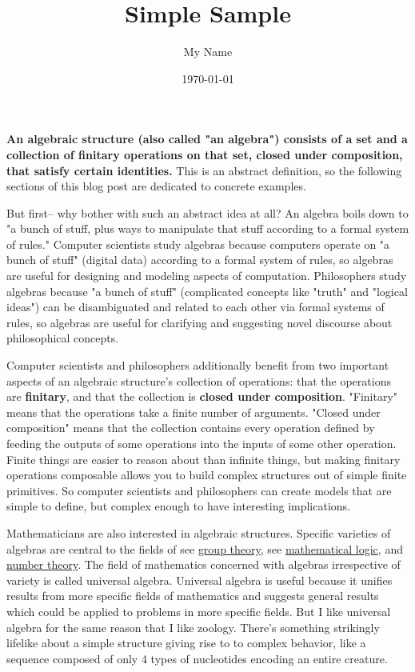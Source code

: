 \documentclass{article} %
\title{Simple Sample} %
\author{My Name} %
\date{\today} %
\begin{document}
\textbf{An algebraic structure (also called "an algebra") consists of a set and a collection of finitary operations on that set, closed under composition, that satisfy certain identities.} This is an abstract definition, so the following sections of this blog post are dedicated to concrete examples.

But first-- why bother with such an abstract idea at all? An algebra boils down to "a bunch of stuff, plus ways to manipulate that stuff according to a formal system of rules." Computer scientists study algebras because computers operate on "a bunch of stuff" (digital data) according to a formal system of rules, so algebras are useful for designing and modeling aspects of computation. Philosophers study algebras because "a bunch of stuff" (complicated concepts like "truth" and "logical ideas") can be disambiguated and related to each other via formal systems of rules, so algebras are useful for clarifying and suggesting novel discourse about philosophical concepts.

Computer scientists and philosophers additionally benefit from two important aspects of an algebraic structure's collection of operations: that the operations are \textbf{finitary}, and that the collection is \textbf{closed under composition}. "Finitary" means that the operations take a finite number of arguments. "Closed under composition" means that the collection contains every operation defined by feeding the outputs of some operations into the inputs of some other operation. Finite things are easier to reason about than infinite things, but making finitary operations composable allows you to build complex structures out of simple finite primitives. So computer scientists and philosophers can create models that are simple to define, but complex enough to have interesting implications.

Mathematicians are also interested in algebraic structures. Specific varieties of algebras are central to the fields of see \href{https://mathworld.wolfram.com/GroupTheory.html}{group theory}, see \href{https://mathworld.wolfram.com/Logic.html}{mathematical logic}, and \href{https://mathworld.wolfram.com/NumberTheory.html}{number theory}. The field of mathematics concerned with algebras irrespective of variety is called universal algebra. Universal algebra is useful because it unifies results from more specific fields of mathematics and suggests general results which could be applied to problems in more specific fields. But I like universal algebra for the same reason that I like zoology. There's something strikingly lifelike about a simple structure giving rise to to complex behavior, like a sequence composed of only 4 types of nucleotides encoding an entire creature.
\end{document}
